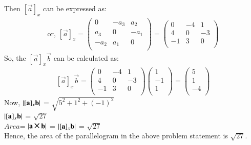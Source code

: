 Then $[\vec{a}]_x$ can be expressed as:\\
\begin{equation}
\begin{aligned}
       \text{or, }[\vec{a}]_x = \begin{pmatrix}
      0       & -a_3    & a_2 \\ 
      a_3       & 0    & -a_1 \\
      -a_2       & a_1     & 0 \\
      
    \end{pmatrix}= \begin{pmatrix}
      0       & -4    & 1 \\ 
      4       & 0    & -3 \\
      -1       & 3     & 0 \\
      
    \end{pmatrix}
\end{aligned}
\end{equation}
So, the $[\vec{a}]_x \vec{b}$ can be calculated as:\\
\begin{equation}
\begin{aligned}
      [\vec{a}]_x \vec{b} = \begin{pmatrix}
      0       & -4    & 1 \\ 
      4       & 0    & -3 \\
      -1       & 3     & 0 \\
      
    \end{pmatrix} \begin{pmatrix}
      1\\ 
      -1\\
      1\\
      
    \end{pmatrix} = \begin{pmatrix}
      5\\ 
      1\\
      -4\\
      
    \end{pmatrix} 
\end{aligned}
\end{equation}
Now, $\left\vert[\mathbf{a}]_x \mathbf{b}\right\vert $ = $\sqrt{5^2 + 1^2 + (-1)^2}$\\
 $\left\vert[\mathbf{a}]_x \mathbf{b}\right\vert $ = $\sqrt{27}$\\
 $Area$= $\abs{\vec{a} \Cross \vec{b}} $ = $\left\vert[\mathbf{a}]_x \mathbf{b}\right\vert $ = $\sqrt{27}$\\
Hence, the area of the parallelogram in the above problem statement is $\sqrt{27}$.\\